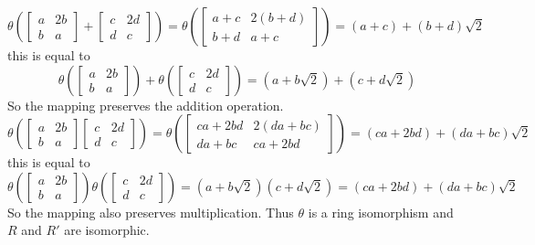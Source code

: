 \documentclass[paper=a4, fontsize=11pt]{jhwhw} %
\begin{document}
$$ 
    \theta\left(
    \left[ \begin{array}{cc}
    a & 2b \\
    b & a \end{array} \right] +
    \left[ \begin{array}{cc}
    c & 2d \\
    d & c \end{array} \right]\right) = 
    \theta\left(
    \left[ \begin{array}{cc}
    a+c & 2(b+d) \\
    b+d & a+c \end{array} \right]\right) = (a+c) + (b + d)\sqrt{2}
$$
this is equal to 
$$ 
    \theta\left(
    \left[ \begin{array}{cc}
    a & 2b \\
    b & a \end{array} \right]\right) + 
            \theta\left(\left[ \begin{array}{cc}
    c & 2d \\
    d & c \end{array} \right]\right) = 
                        (a + b\sqrt{2}) + (c + d\sqrt{2})
$$
So the mapping preserves the addition operation.
$$ 
    \theta\left(
    \left[ \begin{array}{cc}
    a & 2b \\
    b & a \end{array} \right]
    \left[ \begin{array}{cc}
    c & 2d \\
    d & c \end{array} \right]\right) = 
    \theta\left(
    \left[ \begin{array}{cc}
    ca+2bd & 2(da+bc) \\
    da+bc & ca+2bd \end{array} \right]\right) = (ca + 2bd) + (da + bc)\sqrt{2}
$$
this is equal to 
$$ 
    \theta\left(
    \left[ \begin{array}{cc}
    a & 2b \\
    b & a \end{array} \right]\right)
            \theta\left(\left[ \begin{array}{cc}
    c & 2d \\
    d & c \end{array} \right]\right) = 
                        (a + b\sqrt{2})(c + d\sqrt{2}) = (ca + 2bd) + (da + bc)\sqrt{2}
$$
So the mapping also preserves multiplication. Thus $\theta$ is a ring isomorphism and $R$ and $R'$ are isomorphic.
\end{document}
